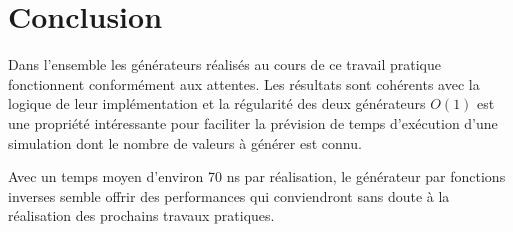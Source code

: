 \documentclass[a4paper,11pt]{article}
\begin{document}
\section{Conclusion}

Dans l'ensemble les générateurs réalisés au cours de ce travail pratique fonctionnent conformément aux attentes. Les résultats sont cohérents avec la logique de leur implémentation et la régularité des deux générateurs $O(1)$ est une propriété intéressante pour faciliter la prévision de temps d'exécution d'une simulation dont le nombre de valeurs à générer est connu.

Avec un temps moyen d'environ 70 ns par réalisation, le générateur par fonctions inverses semble offrir des performances qui conviendront sans doute à la réalisation des prochains travaux pratiques.
\end{document}
